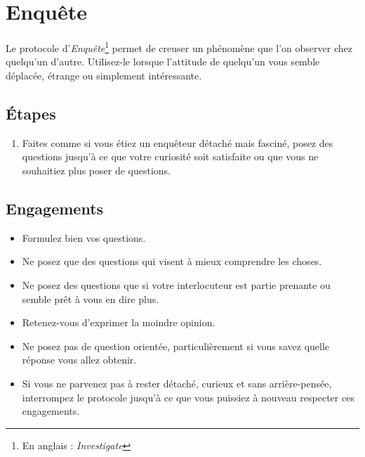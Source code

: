 \documentclass[paper=6in:9in,pagesize=pdftex,headinclude=on,footinclude=on,12pt]{scrbook}
\begin{document}
\section{Enquête} \label{protocole-enquete}

Le protocole d'\emph{Enquête}\footnote{En anglais : \emph{Investigate}} permet de creuser un phénomène que l'on observer chez quelqu'un d'autre.
Utilisez-le lorsque l'attitude de quelqu'un vous semble déplacée, étrange ou simplement intéressante.

\subsection{Étapes}
\begin{enumerate}
	\item Faites comme si vous étiez un enquêteur détaché mais fasciné, posez des questions jusqu'à ce que votre curiosité soit satisfaite ou que vous
	      ne souhaitiez plus poser de questions.
\end{enumerate}

\subsection{Engagements}
\begin{itemize}
	\item Formulez bien vos questions.
	\item Ne posez que des questions qui visent à mieux comprendre les choses.
	\item Ne posez des questions que si votre interlocuteur est partie prenante ou semble prêt à vous en dire plus.
	\item Retenez-vous d'exprimer la moindre opinion.
	\item Ne posez pas de question orientée, particulièrement si vous savez quelle réponse vous allez obtenir.
	\item Si vous ne parvenez pas à rester détaché, curieux et sans arrière-pensée, interrompez le protocole jusqu'à ce que vous puissiez à nouveau
	      respecter ces engagements.
\end{itemize}
\end{document}
